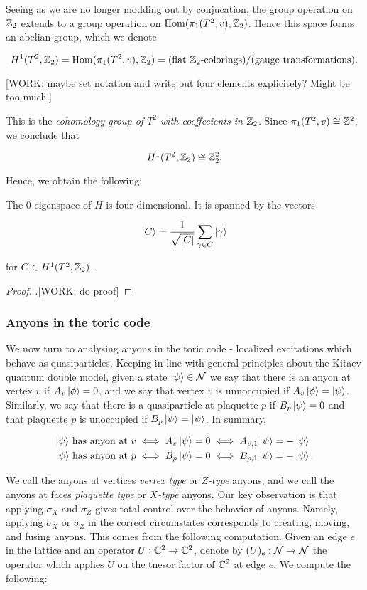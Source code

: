 Seeing as we are no longer modding out by conjucation, the group operation on $\mathbb{Z}_2$ extends to a group operation on $\operatorname{Hom}(\pi_1(T^2,v), \mathbb{Z}_2)$. Hence this space forms an abelian group, which we denote

$$H^1(T^2,\mathbb{Z}_2)=\operatorname{Hom}(\pi_1(T^2,v), \mathbb{Z}_2)=(\text{flat $\mathbb{Z}_2$-colorings})/(\text{gauge transformations}).$$

[WORK: maybe set notation and write out four elements explicitely? Might be too much.]

This is the \textit{cohomology group of $T^2$ with coeffecients in $\mathbb{Z}_2$}. Since $\pi_1(T^2,v)\cong \mathbb{Z}^2$, we conclude that

$$H^1(T^2,\mathbb{Z}_2)\cong \mathbb{Z}_2^2.$$

Hence, we obtain the following:

\begin{proposition} The $0$-eigenspace of $H$ is four dimensional. It is spanned by the vectors

$$\ket{C}=\frac{1}{\sqrt{|C|}}\sum_{\gamma\in C}\ket{\gamma}$$

for $C\in H^1(T^2,\mathbb{Z}_2)$.
\end{proposition}
\begin{proof}.[WORK: do proof]
\end{proof}

\subsubsection{Anyons in the toric code}

We now turn to analysing anyons in the toric code - localized excitations which behave as quasiparticles. Keeping in line with general principles about the Kitaev quantum double model, given a state $\ket{\psi}\in \mathcal{N}$ we say that there is an anyon at vertex $v$ if $A_v\ket{\phi}=0$, and we say that vertex $v$ is unnoccupied if $A_v\ket{\phi}=\ket{\psi}$. Similarly, we say that there is a quasiparticle at plaquette $p$ if $B_p\ket{\psi}=0$ and that plaquette $p$ is unoccupied if $B_p\ket{\psi}=\ket{\psi}$. In summary,

\begin{align*}
\text{$\ket{\psi}$ has anyon at $v$}\iff A_v\ket{\psi}&=0 \iff A_{v,1}\ket{\psi}=-\ket{\psi}\\
\text{$\ket{\psi}$ has anyon at $p$}\iff B_p\ket{\psi}&=0 \iff B_{p,1}\ket{\psi}=-\ket{\psi}.
\end{align*}

We call the anyons at vertices \textit{vertex type} or \textit{$Z$-type} anyons, and we call the anyons at faces \textit{plaquette type} or \textit{$X$-type} anyons. Our key observation is that applying $\sigma_X$ and $\sigma_Z$ gives total control over the behavior of anyons. Namely, applying $\sigma_X$ or $\sigma_Z$ in the correct circumstates corresponds to creating, moving, and fusing anyons. This comes from the following computation. Given an edge $e$ in the lattice and an operator $U:\mathbb{C}^2\to \mathbb{C}^2$, denote by $(U)_e:\mathcal{N}\to\mathcal{N}$ the operator which applies $U$ on the tnesor factor of $\mathbb{C}^2$ at edge $e$. We compute the following:


